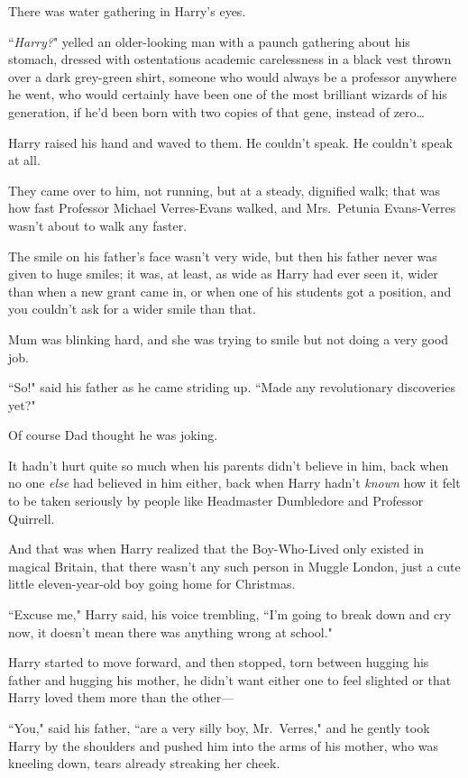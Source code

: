 There was water gathering in Harry's eyes.

``\emph{Harry?}" yelled an older-looking man with a paunch gathering about his stomach, dressed with ostentatious academic carelessness in a black vest thrown over a dark grey-green shirt, someone who would always be a professor anywhere he went, who would certainly have been one of the most brilliant wizards of his generation, if he'd been born with two copies of that gene, instead of zero{\ldots}

Harry raised his hand and waved to them. He couldn't speak. He couldn't speak at all.

They came over to him, not running, but at a steady, dignified walk; that was how fast Professor Michael Verres-Evans walked, and Mrs.~Petunia Evans-Verres wasn't about to walk any faster.

The smile on his father's face wasn't very wide, but then his father never was given to huge smiles; it was, at least, as wide as Harry had ever seen it, wider than when a new grant came in, or when one of his students got a position, and you couldn't ask for a wider smile than that.

Mum was blinking hard, and she was trying to smile but not doing a very good job.

``So!" said his father as he came striding up. ``Made any revolutionary discoveries yet?"

Of course Dad thought he was joking.

It hadn't hurt quite so much when his parents didn't believe in him, back when no one \emph{else} had believed in him either, back when Harry hadn't \emph{known} how it felt to be taken seriously by people like Headmaster Dumbledore and Professor Quirrell.

And that was when Harry realized that the Boy-Who-Lived only existed in magical Britain, that there wasn't any such person in Muggle London, just a cute little eleven-year-old boy going home for Christmas.

``Excuse me," Harry said, his voice trembling, ``I'm going to break down and cry now, it doesn't mean there was anything wrong at school."

Harry started to move forward, and then stopped, torn between hugging his father and hugging his mother, he didn't want either one to feel slighted or that Harry loved them more than the other---

``You," said his father, ``are a very silly boy, Mr.~Verres," and he gently took Harry by the shoulders and pushed him into the arms of his mother, who was kneeling down, tears already streaking her cheek.

